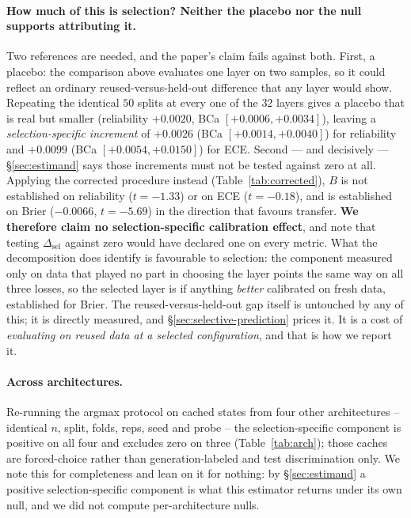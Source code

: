 \documentclass{article}
\begin{document}
\paragraph{How much of this is selection? Neither the placebo nor the null
supports attributing it.} Two references are needed, and the paper's claim
fails against both. First, a placebo: the comparison above evaluates one layer
on two samples, so it could reflect an ordinary reused-versus-held-out
difference that any layer would show. Repeating the identical $50$ splits at
every one of the $32$ layers gives a placebo that is real but smaller
(reliability $+0.0020$, BCa $[+0.0006,+0.0034]$), leaving a
\emph{selection-specific increment} of $+0.0026$ (BCa $[+0.0014,+0.0040]$) for
reliability and $+0.0099$ (BCa $[+0.0054,+0.0150]$) for ECE. Second --- and
decisively --- \S\ref{sec:estimand} says those increments must not be tested
against zero at all. Applying the corrected procedure instead
(Table~\ref{tab:corrected}), $B$ is not established on reliability
($t=-1.33$) or on ECE ($t=-0.18$), and is established on Brier
($-0.0066$, $t=-5.69$) in the direction that favours transfer.
\textbf{We therefore claim no selection-specific calibration effect}, and note
that testing $\Delta_{\text{sel}}$ against zero would have declared one on
every metric. What the decomposition does identify is favourable to selection:
the component measured only on data that played no part in choosing the layer
points the same way on all three losses, so the selected layer is if anything
\emph{better} calibrated on fresh data, established for Brier. The
reused-versus-held-out gap itself is untouched by any of this; it is directly
measured, and \S\ref{sec:selective-prediction} prices it. It is a cost of
\emph{evaluating on reused data at a selected configuration}, and that is how
we report it.

\paragraph{Across architectures.} Re-running the argmax protocol on cached
states from four other architectures -- identical $n$, split, folds, reps, seed
and probe -- the selection-specific component is positive on all four and
excludes zero on three (Table~\ref{tab:arch}); those caches are forced-choice
rather than generation-labeled and test discrimination only. We note this for
completeness and lean on it for nothing: by \S\ref{sec:estimand} a
positive selection-specific component is what this estimator returns under its
own null, and we did not compute per-architecture nulls.
\end{document}
